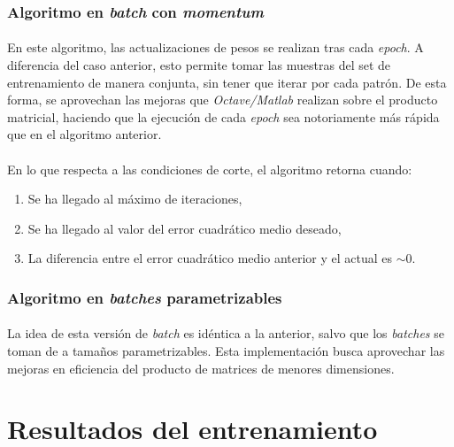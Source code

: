 \documentclass[12pt, twocolumn]{article}
\begin{document}
	
	\subsubsection{Algoritmo en \textit{batch} con \textit{momentum}}
	
	\paragraph{} En este algoritmo, las actualizaciones de pesos se realizan tras cada \textit{epoch}. A diferencia del caso anterior, esto permite tomar las muestras del set de entrenamiento de manera conjunta, sin tener que iterar por cada patrón. De esta forma, se aprovechan las mejoras que \textit{Octave/Matlab} realizan sobre el producto matricial, haciendo que la ejecución de cada \textit{epoch} sea notoriamente más rápida que en el algoritmo anterior. 
	
	\paragraph{} En lo que respecta a las condiciones de corte, el algoritmo retorna cuando:
	
	\begin{enumerate}
		\item Se ha llegado al máximo de iteraciones,
		\item Se ha llegado al valor del error cuadrático medio deseado,
		\item La diferencia entre el error cuadrático medio anterior y el actual es $\sim 0$.
	\end{enumerate}
	
	\subsubsection{Algoritmo en \textit{batches} parametrizables}
	
	\paragraph{} La idea de esta versión de \textit{batch} es idéntica a la anterior, salvo que los \textit{batches} se toman de a tamaños parametrizables. Esta implementación busca aprovechar las mejoras en eficiencia del producto de matrices de menores dimensiones. 
	
	\newpage
	
	\section{Resultados del entrenamiento}
	
\end{document}
